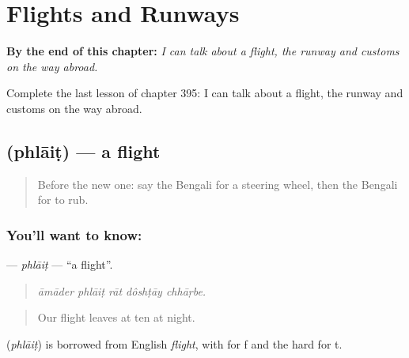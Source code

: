 
\chapter{Flights and Runways}
\label{ch:bn-flights-and-runways}

\begin{chapteropening}
\textbf{By the end of this chapter:} \emph{I can talk about a flight, the runway and customs on the way abroad.}

Complete the last lesson of chapter 395: I can talk about a flight, the runway and customs on the way abroad.
\end{chapteropening}

\section[\texorpdfstring{\bn{ফ্লাইট} (phlāiṭ)}{ফ্লাইট (phlāiṭ)}]{ (phlāiṭ) — a flight}

\label{lesson:BN-C395-phlait}



\begin{quote}
Before the new one: say the Bengali for a steering wheel, then the Bengali for to rub.
\end{quote}

\subsection*{You'll want to know: }
\textbf{} — \emph{phlāiṭ} — \textquotedblleft{}a flight\textquotedblright{}.

\begin{quote}
    
\end{quote}

\begin{quote}
\emph{āmāder phlāiṭ rāt dôshṭāy chhāṛbe.}
\end{quote}

\begin{quote}
Our flight leaves at ten at night.
\end{quote}

\begin{cousinweb}
\textbf{} (\emph{phlāiṭ}) is borrowed from English \emph{flight}, with  for f and the hard  for t.
\end{cousinweb}

